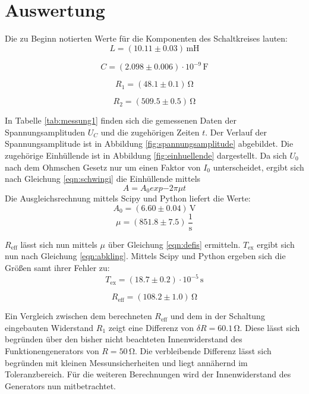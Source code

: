 \section{Auswertung}
\label{sec:Auswertung}
Die zu Beginn notierten Werte für die Komponenten des Schaltkreises lauten:
\begin{equation*}
	L=(10.11 \pm 0.03) \,\si{\milli\henry}
\end{equation*}

\begin{equation*}
	C=(2.098 \pm 0.006) \cdot 10^{-9} \, \si{\farad}
\end{equation*}

\begin{equation*}
	R_\text{1}= (48.1 \pm 0.1) \, \si{\ohm}
\end{equation*}

\begin{equation*}
	R_\text{2}= (509.5\pm 0.5)\,\si{\ohm}
\end{equation*}


In Tabelle \ref{tab:messung1} finden sich die gemessenen Daten der Spannungsamplituden $U_C$ und die zugehörigen Zeiten $t$.
Der Verlauf der Spannungsamplitude ist in Abbildung \ref{fig:spannungsamplitude} abgebildet. Die zugehörige Einhüllende ist in Abbildung \ref{fig:einhuellende} dargestellt.
Da sich $U_\text{0}$ nach dem Ohmschen Gesetz nur um einen Faktor von $I_\text{0}$ unterscheidet, ergibt sich nach Gleichung \eqref{eqn:schwingi} die Einhüllende mittels
\begin{equation}
	A=A_\text{0}exp{-2 \pi \mu t}
\end{equation}
Die Ausgleichsrechnung mittels Scipy und Python liefert die Werte:
\begin{equation*}
	A_0 =  (6.60 \pm 0.04) \,\si{\volt}
\end{equation*}
\begin{equation*}
	\mu =  (851.8 \pm 7.5) \, \frac{1}{\si{\second}}
\end{equation*}

$R_\text{eff}$ lässt sich nun mittels $\mu$ über Gleichung \eqref{eqn:defis} ermitteln. $T_\text{ex}$ ergibt sich nun nach Gleichung \eqref{eqn:abkling}.
Mittels Scipy und Python ergeben sich die Größen samt ihrer Fehler zu:
\begin{equation*}
  T_{\text{ex}}=(18.7 \pm 0.2) \cdot 10^{-5}\,\si{\second}
\end{equation*}

\begin{equation*}
  R_{\text{eff}}= (108.2 \pm 1.0) \,\si{\ohm}
\end{equation*}

Ein Vergleich zwischen dem berechneten $R_\text{eff}$ und dem in der Schaltung eingebauten Widerstand $R_\text{1}$ zeigt eine Differenz von $\delta R=60.1 \,\si{\ohm}$.
Diese lässt sich begründen über den bisher nicht beachteten Innenwiderstand des Funktionengenerators von $R=50\,\si{\ohm}$. Die verbleibende Differenz lässt sich begründen mit kleinen Messunsicherheiten und liegt annähernd im Toleranzbereich.
Für die weiteren Berechnungen wird der Innenwiderstand des Generators nun mitbetrachtet.
